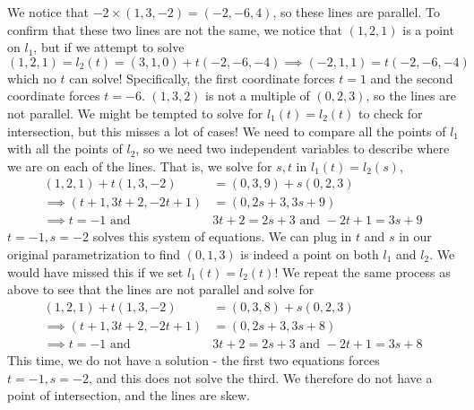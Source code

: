 We notice that $-2\times(1,3,-2)=(-2,-6,4)$, so these lines are parallel. To confirm that these two lines are not the same, we notice that $(1,2,1)$ is a point on $l_1$, but if we attempt to solve\[
(1,2,1)=l_2(t)=(3,1,0)+t(-2,-6,-4) \implies (-2,1,1)=t(-2,-6,-4) 
\]
which no $t$ can solve! Specifically, the first coordinate forces $t=1$ and the second coordinate forces $t=-6$. 
$(1,3,2)$ is not a multiple of $(0,2,3)$, so the lines are not parallel. We might be tempted to solve for $l_1(t)=l_2(t)$ to check for intersection, but this misses a lot of cases! We need to compare all the points of $l_1$ with all the points of $l_2$, so we need two independent variables to describe where we are on each of the lines. That is, we solve for $s,t$ in $l_1(t)=l_2(s)$,
\begin{align*}
	(1,2,1)+t(1,3,-2) &=(0,3,9)+s(0,2,3)\\
	\implies (t+1,3t+2,-2t+1) &= (0,2s+3,3s+9)\\
	\implies t=-1 \textrm{ and } &3t+2=2s+3 \textrm{ and } -2t+1=3s+9
\end{align*}
$t=-1, s=-2$ solves this system of equations. We can plug in $t$ and $s$ in our original parametrization to find $(0,1,3)$ is indeed a point on both $l_1$ and $l_2$. We would have missed this if we set $l_1(t)=l_2(t)$! 
We repeat the same process as above to see that the lines are not parallel and solve for 
\begin{align*}
	(1,2,1)+t(1,3,-2) &=(0,3,8)+s(0,2,3)\\
	\implies (t+1,3t+2,-2t+1) &= (0,2s+3,3s+8)\\
	\implies t=-1 \textrm{ and }& 3t+2=2s+3 \textrm{ and } -2t+1=3s+8
\end{align*}
This time, we do not have a solution - the first two equations forces $t=-1, s=-2$, and this does not solve the third. We therefore do not have a point of intersection, and the lines are skew.
